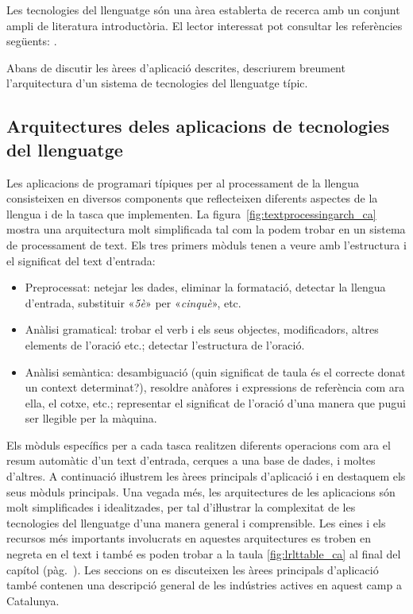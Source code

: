 \begin{multicols}{2}
Les tecnologies del llenguatge són una àrea establerta de recerca amb un conjunt ampli de literatura introductòria. El lector interessat pot consultar les referències següents: \cite{jurafsky-martin01, manning-schuetze1, lt-world1, lt-survey1}.

Abans de discutir les àrees d'aplicació descrites, descriurem breument l'arquitectura d'un sistema de tecnologies del llenguatge típic.

\subsection[Arquitectures de les aplicacions de tecnologies del llenguatge]{Arquitectures de\newline les aplicacions de tecnologies del llenguatge}

Les aplicacions de programari típiques per al processament de la llengua consisteixen en diversos components que reflecteixen diferents aspectes de la llengua i de la tasca que implementen. La figura~\ref{fig:textprocessingarch_ca} mostra una arquitectura molt simplificada tal com la podem trobar en un sistema de processament de text. Els tres primers mòduls tenen a veure amb l’estructura i el significat del text d’entrada:

\begin{itemize}
\item Preprocessat: netejar les dades, eliminar la formatació, detectar la llengua d’entrada, substituir «\textit{5è}» per «\textit{cinquè}», etc.
\item Anàlisi gramatical: trobar el verb i els seus objectes, modificadors, altres elements de l'oració etc.; detectar l’estructura de l’oració.
\item Anàlisi semàntica: desambiguació (quin significat de taula és el correcte donat un context determinat?), resoldre anàfores i expressions de referència com ara ella, el cotxe, etc.; representar el significat de l’oració d’una manera que pugui ser llegible per la màquina.
\end{itemize}

Els mòduls específics per a cada tasca realitzen diferents operacions com ara el resum automàtic d’un text d’entrada, cerques a una base de dades, i moltes d’altres. A continuació iŀlustrem les àrees principals d’aplicació i en destaquem els seus mòduls principals. Una vegada més, les arquitectures de les aplicacions són molt simplificades i idealitzades, per tal d’iŀlustrar la complexitat de les tecnologies del llenguatge d’una manera general i comprensible. Les eines i els recursos més importants involucrats en aquestes arquitectures es troben en negreta en el text i també es poden trobar a la taula \ref{fig:lrlttable_ca} al final del capítol (pàg.~\pageref{fig:lrlttable_ca}). Les seccions on es discuteixen les àrees principals d’aplicació també contenen una descripció general de les indústries actives en aquest camp a Catalunya.


\end{multicols}
